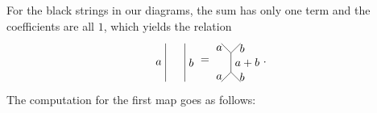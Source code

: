 For the black strings in our diagrams, the sum has only one term and the coefficients are all $1$, which yields the relation
	\begin{equation}
	\label{eq:completeness}
		\begin{tikzpicture}[scale=1.2,baseline=(current bounding box.center)]
			\draw (0,0) to node [left] {$a$} (0,1);
			\draw (0.5,0) to node [right] {$b$} (0.5,1);
		\end{tikzpicture}=
		\begin{tikzpicture}[scale=1.2,baseline=(current bounding box.center)]
			\draw (0,0) to node [left] {$a$} (0.25,0.25);
			\draw (0.5,0) to node [right] {$b$} (0.25,0.25);
			\draw (0,1) to node [left] {$a$} (0.25,0.75);
			\draw (0.5,1) to node [right] {$b$} (0.25,0.75);
			\draw (0.25,0.25) to node [right] {$a+b$} (0.25,0.75);
		\end{tikzpicture}.
	\end{equation}
The computation for the first map goes as follows:
